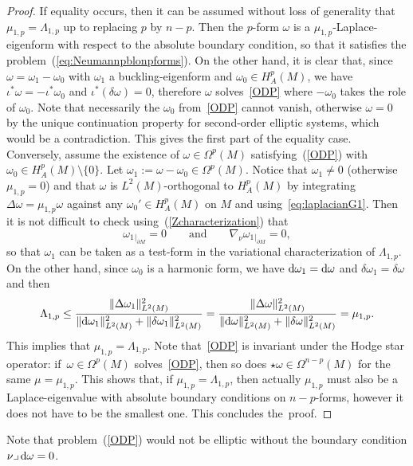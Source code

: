 \documentclass[10pt,a4paper]{amsart}
\numberwithin{equation}{section}
\theoremstyle{definition}
\begin{document}
\begin{proof}
If equality occurs, then it can be assumed without loss of generality that $\mu_{1,p}=\Lambda_{1,p}$ up to replacing $p$ by $n-p$.
Then the $p$-form $\omega$ is a $\mu_{1,p}$-Laplace-eigenform with respect to the absolute boundary condition, so that it satisfies the problem~(\ref{eq:Neumannpblonpforms}).
On the other hand, it is clear that, since $\omega=\omega_1-\omega_0$
with $\omega_1$ a buckling-eigenform and $\omega_0\in H^p_A(M)$, we have $\iota^*\omega=-\iota^*\omega_0$ and ${\iota^*(\delta\omega)=0}$, therefore $\omega$ solves~\eqref{ODP} where $-\omega_0$ takes the role of $\omega_0$.
Note that necessarily the $\omega_0$ from~\eqref{ODP} cannot vanish, otherwise $\omega=0$ by the unique continuation property for second-order elliptic systems, which would be a contradiction.
This gives the first part of the equality case.
Conversely, assume the existence of $\omega\in\Omega^p(M)$ satisfying~(\ref{ODP}) with $\omega_0\in H^p_A(M)\setminus\{0\}$.
Let $\omega_1:=\omega-\omega_0\in\Omega^p(M)$.
Notice that $\omega_1\neq0$ (otherwise $\mu_{1,p}=0$) and that $\omega$ is $L^2(M)$-orthogonal to $H_A^p(M)$ by integrating $\Delta\omega=\mu_{1,p}\omega$ against any $\omega_0'\in H_A^p(M)$ on $M$ and using~\eqref{eq:laplacianG1}.
Then it is not difficult to check using~(\ref{Zcharacterization}) that
\[
\omega_{1}{}_{|_{\partial M}}=0\qquad\text{and}\qquad\nabla_\nu\omega_{1}{}_{|_{\partial M}}=0,
\]
so that $\omega_1$ can be taken as a test-form in the variational characterization of $\Lambda_{1,p}$.
On the other hand, since $\omega_0$ is a harmonic form, we have ${\rm d}\omega_1={\rm d}\omega$ and $\delta\omega_1=\delta\omega$ and then
\[
\Lambda_{1,p}\leq\frac{\|\Delta\omega_1\|^2_{L^2(M)}}{\|{\rm d}\omega_1\|^2_{L^2(M)}+\|\delta\omega_1\|^2_{L^2(M)}}=\frac{\|\Delta\omega\|^2_{L^2(M)}}{\|{\rm d}\omega\|^2_{L^2(M)}+\|\delta\omega\|^2_{L^2(M)}}=\mu_{1,p}.
\]
This implies that $\mu_{1,p}=\Lambda_{1,p}$.
Note that~\eqref{ODP} is invariant under the Hodge star operator: if~${\omega\in\Omega^p(M)}$ solves~\eqref{ODP}, then so does $\star\omega\in\Omega^{n-p}(M)$ for the same $\mu=\mu_{1,p}$.
This shows that, if $\mu_{1,p}=\Lambda_{1,p}$, then actually $\mu_{1,p}$ must also be a Laplace-eigenvalue with absolute boundary conditions on $n-p$-forms, however it does not have to be the smallest one.
This concludes the~proof.
\end{proof}

Note that problem~(\ref{ODP}) would not be elliptic without the boundary condition $\nu\lrcorner\,{\rm d}\omega=0$.
\end{document}
